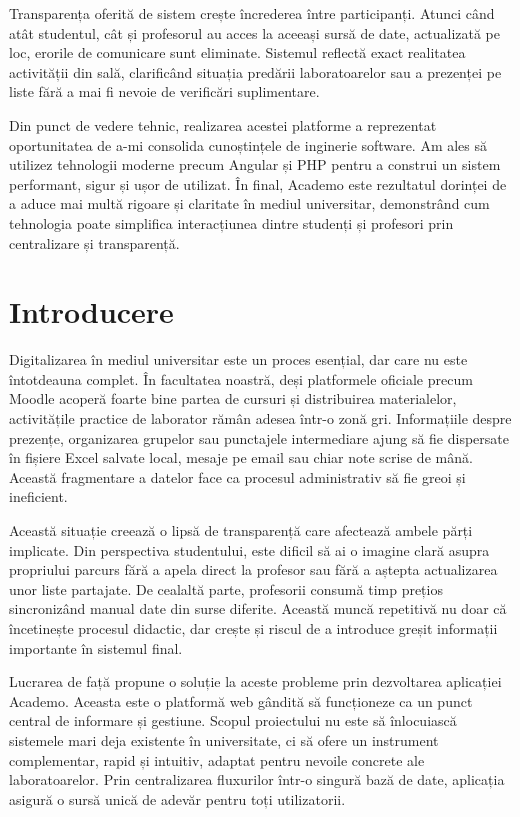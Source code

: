 Transparența oferită de sistem crește încrederea între participanți. Atunci când atât studentul,
cât și profesorul au acces la aceeași sursă de date, actualizată pe loc, erorile de comunicare sunt
eliminate. Sistemul reflectă exact realitatea activității din sală, clarificând situația predării
laboratoarelor sau a prezenței pe liste fără a mai fi nevoie de verificări suplimentare.

Din punct de vedere tehnic, realizarea acestei platforme a reprezentat oportunitatea de a-mi
consolida cunoștințele de inginerie software. Am ales să utilizez tehnologii moderne precum
Angular și PHP pentru a construi un sistem performant, sigur și ușor de utilizat. În final,
Academo este rezultatul dorinței de a aduce mai multă rigoare și claritate în mediul universitar,
demonstrând cum tehnologia poate simplifica interacțiunea dintre studenți și profesori prin centralizare și transparență.

\newpage

\chapter*{Introducere}

Digitalizarea în mediul universitar este un proces esențial, dar care nu este întotdeauna complet.
În facultatea noastră, deși platformele oficiale precum Moodle acoperă foarte bine partea de cursuri
și distribuirea materialelor, activitățile practice de laborator rămân adesea într-o zonă gri.
Informațiile despre prezențe, organizarea grupelor sau punctajele intermediare ajung să fie dispersate
în fișiere Excel salvate local, mesaje pe email sau chiar note scrise de mână. Această fragmentare a
datelor face ca procesul administrativ să fie greoi și ineficient.

Această situație creează o lipsă de transparență care afectează ambele părți implicate. Din perspectiva studentului, 
este dificil să ai o imagine clară asupra propriului parcurs fără a apela direct la profesor sau fără a aștepta 
actualizarea unor liste partajate. De cealaltă parte, profesorii consumă timp prețios sincronizând manual date 
din surse diferite. Această muncă repetitivă nu doar că încetinește procesul didactic, dar crește și riscul de a 
introduce greșit informații importante în sistemul final.

Lucrarea de față propune o soluție la aceste probleme prin dezvoltarea aplicației Academo. Aceasta este o platformă
web gândită să funcționeze ca un punct central de informare și gestiune. Scopul proiectului nu este să înlocuiască
sistemele mari deja existente în universitate, ci să ofere un instrument complementar, rapid și intuitiv, adaptat
pentru nevoile concrete ale laboratoarelor. Prin centralizarea fluxurilor într-o singură bază de date, aplicația
asigură o sursă unică de adevăr pentru toți utilizatorii.

